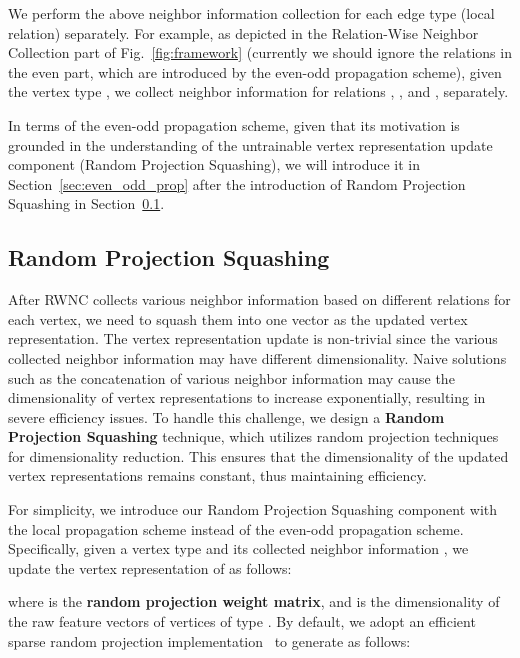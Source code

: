 \documentclass[lettersize,journal]{IEEEtran}
\begin{document}
We perform the above neighbor information collection for each edge type (local relation)  separately.
For example, as depicted in the Relation-Wise Neighbor Collection part of Fig.~\ref{fig:framework} (currently we should ignore the relations in the even part, which are introduced by the even-odd propagation scheme), given the vertex type , we collect neighbor information for relations , , and , separately.


In terms of the even-odd propagation scheme, given that its motivation is grounded in the understanding of the untrainable vertex representation update component (Random Projection Squashing), we will introduce it in Section~\ref{sec:even_odd_prop} after the introduction of Random Projection Squashing in Section~\ref{sec:rand_proj_squash}.












\subsection{Random Projection Squashing}\label{sec:rand_proj_squash} 

After RWNC collects various neighbor information based on different relations for each vertex, we need to squash them into one vector as the updated vertex representation.
The vertex representation update is non-trivial since the various collected neighbor information may have different dimensionality.
Naive solutions such as the concatenation of various neighbor information may cause the dimensionality of vertex representations to increase exponentially, resulting in severe efficiency issues.
To handle this challenge, we design a \textbf{Random Projection Squashing} technique, which utilizes random projection techniques for dimensionality reduction. 
This ensures that the dimensionality of the updated vertex representations remains constant, thus maintaining efficiency.


For simplicity, we introduce our Random Projection Squashing component with the local propagation scheme instead of the even-odd propagation scheme. 
Specifically, given a vertex type  and its collected neighbor information , we update the vertex representation of  as follows:

where  is the \textbf{random projection weight matrix}, and  is the dimensionality of the raw feature vectors of vertices of type .
By default, we adopt an efficient sparse random projection implementation~\cite{DBLP:conf/pods/Achlioptas01} to generate  as follows:
\end{document}
